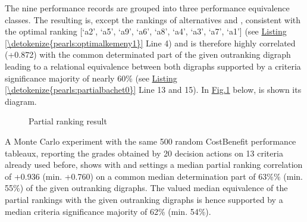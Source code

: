 \documentclass[a4paper,12pt,english]{sphinxhowto}
\let\sphinxpxdimen\pdfpxdimen\else\newdimen\sphinxpxdimen
\begin{document}
\sphinxAtStartPar
The nine performance records are grouped into three performance equivalence classes. The resulting  is, except the rankings of alternatives  and , consistent with the optimal  ranking {[}‘a2’, ‘a5’, ‘a9’, ‘a6’, ‘a8’, ‘a4’, ‘a3’, ‘a7’, ‘a1’{]} (see \hyperref[\detokenize{pearls:optimalkemeny1}]{Listing \ref{\detokenize{pearls:optimalkemeny1}}} Line 4) and is therefore highly correlated (+0.872) with the common determinated part of the given outranking digraph   leading to a relational equivalence between both digraphs supported by a criteria significance majority of nearly 60\% (see \hyperref[\detokenize{pearls:partialbachet0}]{Listing \ref{\detokenize{pearls:partialbachet0}}} Line 13 and 15). In \hyperref[\detokenize{pearls:partialbachet1}]{Fig.\@ \ref{\detokenize{pearls:partialbachet1}}} below, is shown its  diagram.

\begin{sphinxVerbatim}[commandchars=\\\{\},numbers=left,firstnumber=1,stepnumber=1]
\end{sphinxVerbatim}

\begin{figure}[H]
\centering
\capstart

\noindent\sphinxincludegraphics[width=350\sphinxpxdimen]{{partialBachet1}.png}
\caption{Partial  ranking result}\label{\detokenize{pearls:partialbachet1}}\end{figure}

\sphinxAtStartPar
A Monte Carlo experiment with the same 500 random Cost\sphinxhyphen{}Benefit performance tableaux, reporting the grades obtained by 20 decision actions on 13 criteria already used before, shows with  and  settings a median partial ranking correlation of +0.936 (min. +0.760) on a common median determination part of 63\%\% (min. 55\%) of the given outranking digraphs. The valued median equivalence of the partial rankings with the given outranking digraphs is hence supported by a median criteria significance majority of 62\% (min. 54\%).
\end{document}
